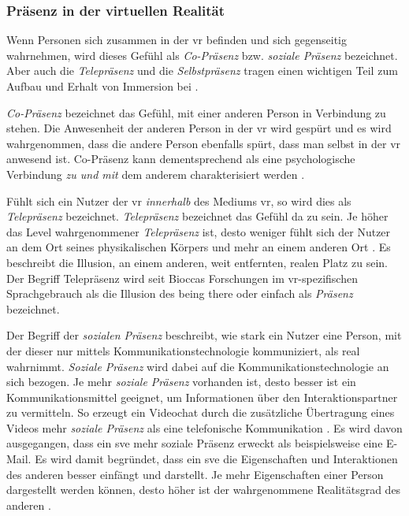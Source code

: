 \documentclass[a4paper,11pt]{article}%
\renewcommand{\\}{\vspace*{0.5\baselineskip} \newline}
\begin{document}
		\subsubsection{Präsenz in der virtuellen Realität}
Wenn Personen sich zusammen in der \ac{vr} befinden und sich gegenseitig wahrnehmen, wird dieses Gefühl als \textit{Co-Präsenz} bzw. \textit{soziale Präsenz} bezeichnet. Aber auch die \textit{Telepräsenz} und die \textit{Selbstpräsenz} tragen einen wichtigen Teil zum Aufbau und Erhalt von Immersion bei \citep{schuemie2001research}.

\textit{Co-Präsenz} bezeichnet das Gefühl, mit einer anderen Person in Verbindung zu stehen.
Die Anwesenheit der anderen Person in der \ac{vr} wird gespürt und es wird wahrgenommen, dass die andere Person ebenfalls spürt, dass man selbst in der \ac{vr} anwesend ist. 
Co-Präsenz kann dementsprechend als eine psychologische Verbindung \textit{zu und mit} dem anderem charakterisiert werden \citep[179-182]{ijsselsteijn2001presence}.

Fühlt sich ein Nutzer der \ac{vr} \textit{innerhalb} des Mediums \ac{vr}, so wird dies als \textit{Telepräsenz} bezeichnet. \textit{Telepräsenz} bezeichnet das Gefühl \glqq{}da zu sein\dq{}. Je höher das Level wahrgenommener \textit{Telepräsenz} ist, desto weniger fühlt sich der Nutzer an dem Ort seines physikalischen Körpers und mehr an einem anderen Ort \citep[S. 482]{nowak2003effect}. Es beschreibt die Illusion, an einem anderen, weit entfernten, realen Platz zu sein. Der Begriff Telepräsenz wird seit Bioccas Forschungen \cite[p.12]{biocca1999cyborg} im \ac{vr}-spezifischen Sprachgebrauch als die Illusion des \glqq{}being there\dq{} oder einfach als \textit{Präsenz} bezeichnet.

Der Begriff der \textit{sozialen Präsenz} beschreibt, wie stark ein Nutzer eine Person, mit der dieser nur mittels Kommunikationstechnologie kommuniziert, als \glqq{}real\dq{} wahrnimmt. \textit{Soziale Präsenz} wird dabei auf die Kommunikationstechnologie an sich bezogen. Je mehr \textit{soziale Präsenz} vorhanden ist, desto besser ist ein Kommunikationsmittel geeignet, um Informationen über den Interaktionspartner zu vermitteln. So erzeugt ein Videochat durch die zusätzliche Übertragung eines Videos mehr \textit{soziale Präsenz} als eine telefonische Kommunikation \citep[S. 151]{gunawardena1995social}.
Es wird davon ausgegangen, dass ein \ac{sve} mehr soziale Präsenz erweckt als beispielsweise eine E-Mail. Es wird damit begründet, dass ein \ac{sve} die Eigenschaften und Interaktionen des anderen besser einfängt und darstellt. Je mehr Eigenschaften einer Person dargestellt werden können, desto höher ist der wahrgenommene Realitätsgrad des anderen \citep[S. 5-8]{biocca2002defining}.
\end{document}
